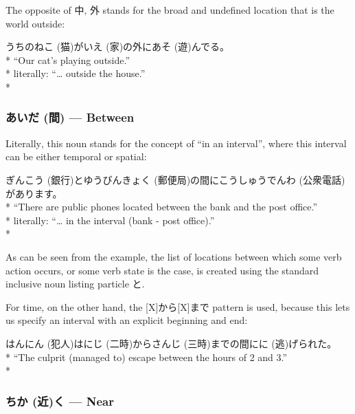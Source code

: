 \documentclass[11pt, b5paper, twoside, openright, onecolumn]{book}
\makeatletter
\newcommand*{\rubystack}[2]{{\relscale{0.5}%
  \begin{tabular}[b]{@{}c@{}}%
    {#1}\\%
   {\textscale{2}{#2}}%
  \end{tabular}}%
}
\DeclareRobustCommand*{\ruby}[2]{%
  \mbox{%
    \setlength{\parskip}{0ex}%
    \BeginAccSupp{method=pdfstringdef,ActualText={#1}}%
      \rubystack{\phantom{#2}}{#1}%
      \llap{%
        \rubystack{#2}{\phantom{#1}}%
      }%
    \EndAccSupp{}%
  }%
}
\renewcommand*{\ruby}[2]{#2 (#1)}%
\newenvironment{exampleblock}{
\setlength{\parindent}{0.6in}
\begin{minipage}[t]{\dimexpr\textwidth-\parindent}}
{\end{minipage}}
\makeatother
\begin{document}
The opposite of 中‚ 外 stands for the broad and undefined location that is the world outside:

\vspace{0.4cm}
\begin{exampleblock}
うちの\ruby{猫}{ねこ}が\ruby{家}{いえ}の外に\ruby{遊}{あそ}んでる。 \\* 
“Our cat’s playing outside.” \\* 
literally: “… outside the house.” \\* 
\end{exampleblock}
\subsubsection{\ruby{間}{あいだ} — Between}


Literally‚ this noun stands for the concept of “in an interval”‚ where this interval can be either temporal or spatial:

\vspace{0.4cm}
\begin{exampleblock}
\ruby{銀行}{ぎんこう}と\ruby{郵便局}{ゆうびんきょく}の間に\ruby{公衆電話}{こうしゅうでんわ}があります。 \\* 
“There are public phones located between the bank and the post office.” \\* 
literally: “… in the interval (bank - post office).” \\* 
\end{exampleblock}
\vspace{0.2cm}

As can be seen from the example‚ the list of locations between which some verb action occurs‚ or some verb state is the case‚ is created using the standard inclusive noun listing particle と.

For time‚ on the other hand‚ the [X]から[X]まで pattern is used‚ because this lets us specify an interval with an explicit beginning and end:

\vspace{0.4cm}
\begin{exampleblock}
\ruby{犯人}{はんにん}は\ruby{二時}{にじ}から\ruby{三時}{さんじ}までの間に\ruby{逃}{に}げられた。 \\* 
“The culprit (managed to) escape between the hours of 2 and 3.” \\* 
\end{exampleblock}
\subsubsection{\ruby{近}{ちか}く — Near}
\end{document}
